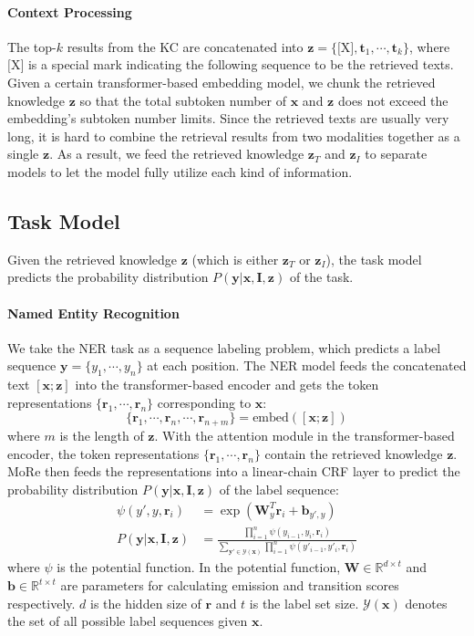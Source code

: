 \documentclass[11pt]{article}
\def\vb{{\bm{b}}}
\def\vr{{\bm{r}}}
\def\vt{{\bm{t}}}
\def\vx{{\bm{x}}}
\def\vy{{\bm{y}}}
\def\vz{{\bm{z}}}
\def\mI{{\bm{I}}}
\def\mW{{\bm{W}}}
\def\sR{{\mathbb{R}}}
\begin{document}
\paragraph{Context Processing}
The top-$k$ results from the KC are concatenated into $\vz = \{\text{[X]},\vt_1, \cdots, \vt_k\}$, where $\text{[X]}$ is a special mark indicating the following sequence to be the retrieved texts. Given a certain transformer-based embedding model, we chunk the retrieved knowledge $\vz$ so that the total subtoken number of $\vx$ and $\vz$ does not exceed the embedding's subtoken number limits.
Since the retrieved texts are usually very long, it is hard to combine the retrieval results from two modalities together as a single $\vz$. As a result, we feed the retrieved knowledge $\vz_T$ and $\vz_I$ to separate models to let the model fully utilize each kind of information.



\subsection{Task Model}
Given the retrieved knowledge $\vz$ (which is either $\vz_{T}$ or $\vz_{I}$), the task model predicts the probability distribution $P(\vy|\vx,\mI,\vz)$ of the task. 


\paragraph{Named Entity Recognition} We take the NER task as a sequence labeling problem, which predicts a label sequence $\vy= \{y_1, \cdots, y_n\}$ at each position. 
The NER model feeds the concatenated text $[\vx;\vz]$ into the transformer-based encoder and gets the token representations $\{\vr_1, \cdots, \vr_n\}$ corresponding to $\vx$:
\begin{displaymath}
\{\vr_1,\cdots,\vr_n,\cdots,\vr_{n+m}\} = \text{embed} ([\vx;\vz])
\end{displaymath}
where $m$ is the length of $\vz$. With the attention module in the transformer-based encoder, the token representations $\{\vr_1, \cdots, \vr_n\}$ contain the retrieved knowledge $\vz$. MoRe then feeds the representations into a linear-chain CRF layer to predict the probability distribution $P(\vy|\vx,\mI,\vz)$ of the label sequence:
\begin{align}
    \psi(y', y, \vr_i) &= \exp(\mW_{y}^{T} \vr_i + \vb_{y',y}) \nonumber\\
    P(\vy|\vx,\mI,\vz) &= \frac{\prod\limits_{i=1}^{n} \psi(y_{i-1}, y_i, \vr_i)}{\sum\limits_{\vy' \in \mathcal{Y}(\vx)} \prod\limits_{i=1}^{n} \psi(y'_{i-1}, y'_i, \vr_i)}\nonumber
\end{align}
where $\psi$ is the potential function. In the potential function, $\mW \in \sR^{d\times t}$ and $\vb \in \sR^{t \times t}$ are parameters for calculating emission and transition scores respectively. $d$ is the hidden size of $\vr$ and $t$ is the label set size. $\mathcal{Y}(\vx)$ denotes the set of all possible label sequences given $\vx$.
\end{document}
